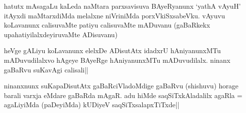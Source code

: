 \begin{artha}
hatutx mAsagaLu kaLeda naMtara parxsavisuva BAyeRyanunx `yathA vAyuH' 
itAyxdi maMtarxdiMda melalxne niVriniMda porxVkiSxsabeVku. vAyuvu 
koLavanunx calisuvaMte patiyu calisuvaMte mADuvanu (gaBaRkekx 
upahatiyilalxdeyiruvaMte ADisuvanu)
\end{artha}


\begin{artha}
heVge gALiyu koLavanunx elelxDe ADisutAtx idadxrU hAniyanunxMTu 
mADuvudilalxvo hAgeye BAyeRge hAniyanunxMTu mADuvudilalx. ninanx 
gaBaRvu suKavAgi calisali||
\end{artha}

\begin{artha}
ninanxnunx suKapaDisutAtx gaBaRciVladoMdige gaBaRvu (shishuvu) horage 
barali varxja eMdare gaBaRda mAgaR. adu hiMde saqSiTxkAladalilx agaRla 
= agaLiyiMda (paDeyiMda) kUDiyeV saqSiTxsalapxTiTxde||
\end{artha}

\vishaya{}

\begin{artha}

\end{artha}

\begin{artha}

\end{artha}

\begin{artha}

\end{artha}

\begin{artha}

\end{artha}

\begin{artha}

\end{artha}

\begin{artha}

\end{artha}

\begin{artha}

\end{artha}

\begin{artha}

\end{artha}

